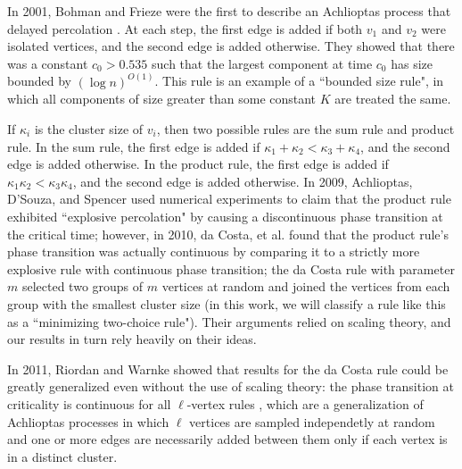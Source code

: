 \documentclass[twoside,10pt]{article}
\begin{document}
In 2001, Bohman and Frieze were the first to describe an Achlioptas process that delayed percolation \cite{BF}. At each step, the first edge is added if both $v_1$ and $v_2$ were isolated vertices, and the second edge is added otherwise. They showed that there was a constant $c_0>0.535$ such that the largest component at time $c_0$ has size bounded by $(\log n)^{O(1)}$. This rule is an example of a ``bounded size rule", in which all components of size greater than some constant $K$ are treated the same.

If $\kappa_i$ is the cluster size of $v_{i}$, then two possible rules are the sum rule and product rule. In the sum rule, the first edge is added if $\kappa_1+\kappa_2 < \kappa_3+\kappa_4$, and the second edge is added otherwise. In the product rule, the first edge is added if $\kappa_1 \kappa_2 < \kappa_3 \kappa_4$, and the second edge is added otherwise. In 2009, Achlioptas, D'Souza, and Spencer \cite{discontinuous} used numerical experiments to claim that the product rule exhibited ``explosive percolation" by causing a discontinuous phase transition at the critical time; however, in 2010, da Costa, et al. \cite{dacosta2010} found that the product rule's phase transition was actually continuous by comparing it to a strictly more explosive rule with continuous phase transition; the da Costa rule with parameter $m$ selected two groups of $m$ vertices at random and joined the vertices from each group with the smallest cluster size (in this work, we will classify a rule like this as a ``minimizing two-choice rule"). Their arguments relied on scaling theory, and our results in turn rely heavily on their ideas.

In 2011, Riordan and Warnke showed that results for the da Costa rule could be greatly generalized even without the use of scaling theory: the phase transition at criticality is continuous for all $\ell$-vertex rules \cite{RW-cont}, which are a generalization of Achlioptas processes in which $\ell$ vertices are sampled independetly at random and one or more edges are necessarily added between them only if each vertex is in a distinct cluster.
\end{document}
